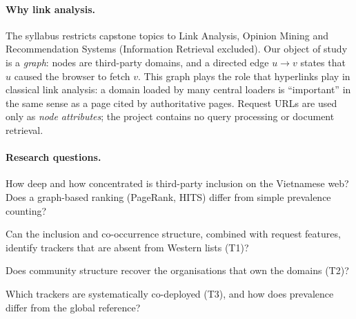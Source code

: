 \documentclass[11pt,a4paper]{article}
\begin{document}
\paragraph{Why link analysis.} The syllabus restricts capstone topics to Link Analysis, Opinion
Mining and Recommendation Systems (Information Retrieval excluded). Our object of study is a
\emph{graph}: nodes are third-party domains, and a directed edge $u\to v$ states that $u$ caused
the browser to fetch $v$. This graph plays the role that hyperlinks play in classical link
analysis: a domain loaded by many central loaders is ``important'' in the same sense as a page
cited by authoritative pages. Request URLs are used only as \emph{node attributes}; the project
contains no query processing or document retrieval.

\paragraph{Research questions.}
\begin{description}[leftmargin=1.2cm,labelwidth=1cm,font=\normalfont\bfseries]
  \item[RQ1] How deep and how concentrated is third-party inclusion on the Vietnamese web? Does a
  graph-based ranking (PageRank, HITS) differ from simple prevalence counting?
  \item[RQ2] Can the inclusion and co-occurrence structure, combined with request features,
  identify trackers that are absent from Western lists (T1)?
  \item[RQ3] Does community structure recover the organisations that own the domains (T2)?
  \item[RQ4] Which trackers are systematically co-deployed (T3), and how does prevalence differ
  from the global reference?
\end{description}
\end{document}
